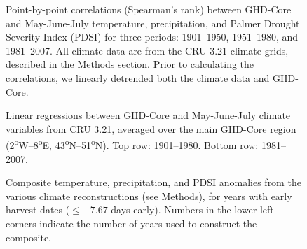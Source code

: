 \documentclass[final]{nature}
\begin{document}
\begin{figure}
\caption{Point-by-point correlations (Spearman's rank) between GHD-Core and May-June-July temperature, precipitation, and Palmer Drought Severity Index (PDSI) for three periods: 1901--1950, 1951--1980, and 1981--2007. All climate data are from the CRU 3.21 climate grids, described in the Methods section. Prior to calculating the correlations, we linearly detrended both the climate data and GHD-Core.}
\end{figure}

\begin{figure}
\caption{Linear regressions between GHD-Core and May-June-July climate variables from CRU 3.21, averaged over the main GHD-Core region (2\textsuperscript{o}W--8\textsuperscript{o}E, 43\textsuperscript{o}N--51\textsuperscript{o}N). Top row: 1901--1980. Bottom row: 1981--2007.}
\end{figure}

\begin{figure}
\caption{Composite temperature, precipitation, and PDSI anomalies from the various climate reconstructions (see Methods), for years with early harvest dates ($\le-7.67$ days early). Numbers in the lower left corners indicate the number of years used to construct the composite.}
\end{figure}

\end{document}
